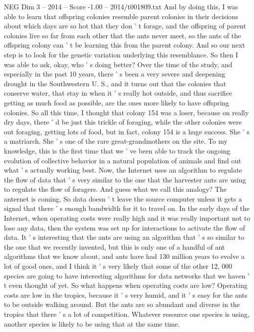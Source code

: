 \begin{textsample}{NEG Dim 3 – 2014 – Score -1.00 – 2014/t001809.txt}
And by doing this, I was able to learn that offspring colonies resemble parent colonies in their decisions about which days are so hot that they don ' t forage, and the offspring of parent colonies live so far from each other that the ants never meet, so the ants of the offspring colony can ' t be learning this from the parent colony.
And so our next step is to look for the genetic variation underlying this resemblance.
So then I was able to ask, okay, who ' s doing better?
Over the time of the study, and especially in the past 10 years, there ' s been a very severe and deepening drought in the Southwestern U.
S., and it turns out that the colonies that conserve water, that stay in when it ' s really hot outside, and thus sacrifice getting as much food as possible, are the ones more likely to have offspring colonies.
So all this time, I thought that colony 154 was a loser, because on really dry days, there ' d be just this trickle of foraging, while the other colonies were out foraging, getting lots of food, but in fact, colony 154 is a huge success.
She ' s a matriarch.
She ' s one of the rare great-grandmothers on the site.
To my knowledge, this is the first time that we ' ve been able to track the ongoing evolution of collective behavior in a natural population of animals and find out what ' s actually working best.
Now, the Internet uses an algorithm to regulate the flow of data that ' s very similar to the one that the harvester ants are using to regulate the flow of foragers.
And guess what we call this analogy?
The anternet is coming.
So data doesn ' t leave the source computer unless it gets a signal that there ' s enough bandwidth for it to travel on.
In the early days of the Internet, when operating costs were really high and it was really important not to lose any data, then the system was set up for interactions to activate the flow of data.
It ' s interesting that the ants are using an algorithm that ' s so similar to the one that we recently invented, but this is only one of a handful of ant algorithms that we know about, and ants have had 130 million years to evolve a lot of good ones, and I think it ' s very likely that some of the other 12, 000 species are going to have interesting algorithms for data networks that we haven ' t even thought of yet.
So what happens when operating costs are low?
Operating costs are low in the tropics, because it ' s very humid, and it ' s easy for the ants to be outside walking around.
But the ants are so abundant and diverse in the tropics that there ' s a lot of competition.
Whatever resource one species is using, another species is likely to be using that at the same time.

\end{textsample}
